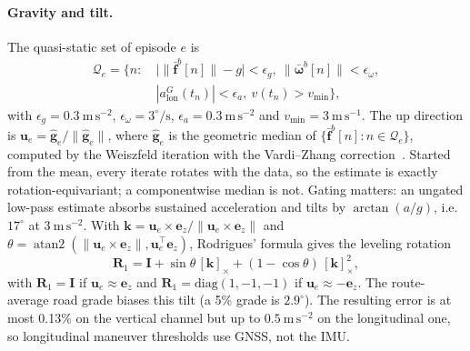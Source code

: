 \paragraph{Gravity and tilt.}
The quasi-static set of episode $e$ is
\begin{equation}
\begin{aligned}
\mathcal Q_e=\bigl\{n:\ &\bigl|\lVert\bar{\mathbf f}^b[n]\rVert-g\bigr|<\epsilon_g,\ \lVert\bar{\boldsymbol\omega}^b[n]\rVert<\epsilon_\omega,\\
&|a^G_{\mathrm{lon}}(t_n)|<\epsilon_a,\ v(t_n)>v_{\min}\bigr\},
\end{aligned}
\end{equation}
with $\epsilon_g=0.3~\mathrm{m\,s^{-2}}$, $\epsilon_\omega=3^\circ/\mathrm s$, $\epsilon_a=0.3~\mathrm{m\,s^{-2}}$ and $v_{\min}=3~\mathrm{m\,s^{-1}}$.
The up direction is $\mathbf u_e=\hat{\mathbf g}_e/\lVert\hat{\mathbf g}_e\rVert$, where $\hat{\mathbf g}_e$ is the geometric median of $\{\bar{\mathbf f}^b[n]:n\in\mathcal Q_e\}$, computed by the Weiszfeld iteration with the Vardi--Zhang correction~\cite{vardi2000l1median}.
Started from the mean, every iterate rotates with the data, so the estimate is exactly rotation-equivariant; a componentwise median is not.
Gating matters: an ungated low-pass estimate absorbs sustained acceleration and tilts by $\arctan(a/g)$, i.e.\ $17^\circ$ at $3~\mathrm{m\,s^{-2}}$.
With $\mathbf k=\mathbf u_e\times\mathbf e_z/\lVert\mathbf u_e\times\mathbf e_z\rVert$ and $\theta=\operatorname{atan2}(\lVert\mathbf u_e\times\mathbf e_z\rVert,\mathbf u_e^\top\mathbf e_z)$, Rodrigues' formula gives the leveling rotation
\begin{equation}
\mathbf R_1=\mathbf I+\sin\theta\,[\mathbf k]_\times+(1-\cos\theta)\,[\mathbf k]_\times^2 ,
\end{equation}
with $\mathbf R_1=\mathbf I$ if $\mathbf u_e\approx\mathbf e_z$ and $\mathbf R_1=\mathrm{diag}(1,-1,-1)$ if $\mathbf u_e\approx-\mathbf e_z$.
The route-average road grade biases this tilt (a 5\% grade is $2.9^\circ$).
The resulting error is at most 0.13\% on the vertical channel but up to $0.5~\mathrm{m\,s^{-2}}$ on the longitudinal one, so longitudinal maneuver thresholds use GNSS, not the IMU.

